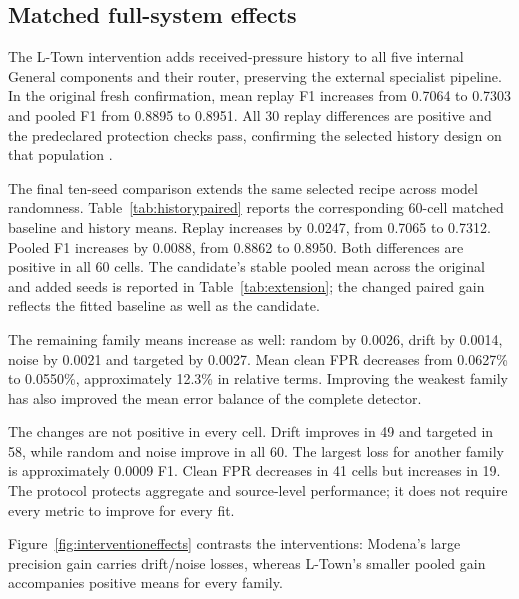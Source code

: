 \subsection{Matched full-system effects}
The L-Town intervention adds received-pressure history to all five internal General components and their router, preserving the external specialist pipeline. In the original fresh confirmation, mean replay F1 increases from 0.7064 to 0.7303 and pooled F1 from 0.8895 to 0.8951. All 30 replay differences are positive and the predeclared protection checks pass, confirming the selected history design on that population \cite{projecthistory}.

The final ten-seed comparison extends the same selected recipe across model randomness. Table~\ref{tab:historypaired} reports the corresponding 60-cell matched baseline and history means. Replay increases by 0.0247, from 0.7065 to 0.7312. Pooled F1 increases by 0.0088, from 0.8862 to 0.8950. Both differences are positive in all 60 cells. The candidate's stable pooled mean across the original and added seeds is reported in Table~\ref{tab:extension}; the changed paired gain reflects the fitted baseline as well as the candidate.



The remaining family means increase as well: random by 0.0026, drift by 0.0014, noise by 0.0021 and targeted by 0.0027. Mean clean FPR decreases from 0.0627\% to 0.0550\%, approximately 12.3\% in relative terms. Improving the weakest family has also improved the mean error balance of the complete detector.

The changes are not positive in every cell. Drift improves in 49 and targeted in 58, while random and noise improve in all 60. The largest loss for another family is approximately 0.0009 F1. Clean FPR decreases in 41 cells but increases in 19. The protocol protects aggregate and source-level performance; it does not require every metric to improve for every fit.


Figure~\ref{fig:interventioneffects} contrasts the interventions: Modena's large precision gain carries drift/noise losses, whereas L-Town's smaller pooled gain accompanies positive means for every family.

